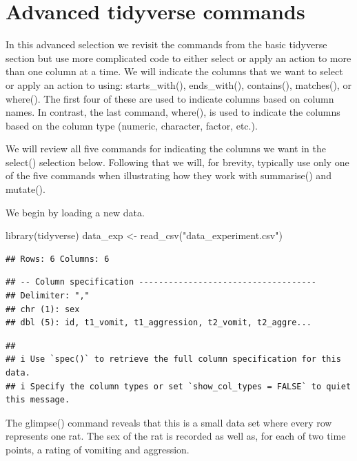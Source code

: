 \documentclass[
]{krantz}
\makeatletter
\newenvironment{Shaded}{\begin{snugshade}}{\end{snugshade}}
\newcommand{\FunctionTok}[1]{\textcolor[rgb]{0,0,0}{#1}}
\newcommand{\NormalTok}[1]{#1}
\newcommand{\OtherTok}[1]{\textcolor[rgb]{0.37,0.37,0.37}{#1}}
\newcommand{\StringTok}[1]{\textcolor[rgb]{0.5,0.5,0.5}{#1}}
\newenvironment{kframe}{%
\medskip{}
\setlength{\fboxsep}{.8em}
 \def\at@end@of@kframe{}%
 \ifinner\ifhmode%
  \def\at@end@of@kframe{\end{minipage}}%
  \begin{minipage}{\columnwidth}%
 \fi\fi%
 \def\FrameCommand##1{\hskip\@totalleftmargin \hskip-\fboxsep
 \colorbox{shadecolor}{##1}\hskip-\fboxsep
     \hskip-\linewidth \hskip-\@totalleftmargin \hskip\columnwidth}%
 \MakeFramed {\advance\hsize-\width
   \@totalleftmargin\z@ \linewidth\hsize
   \@setminipage}}%
 {\par\unskip\endMakeFramed%
 \at@end@of@kframe}
\renewenvironment{Shaded}{\begin{kframe}}{\end{kframe}}
\makeatother
\begin{document}
\hypertarget{advanced-tidyverse-commands}{%
\section{Advanced tidyverse commands}\label{advanced-tidyverse-commands}}

In this advanced selection we revisit the commands from the basic tidyverse section but use more complicated code to either select or apply an action to more than one column at a time. We will indicate the columns that we want to select or apply an action to using: starts\_with(), ends\_with(), contains(), matches(), or where(). The first four of these are used to indicate columns based on column names. In contrast, the last command, where(), is used to indicate the columns based on the column type (numeric, character, factor, etc.).

We will review all five commands for indicating the columns we want in the select() selection below. Following that we will, for brevity, typically use only one of the five commands when illustrating how they work with summarise() and mutate().

We begin by loading a new data.

\begin{Shaded}
\begin{Highlighting}[]
\FunctionTok{library}\NormalTok{(tidyverse)}
\NormalTok{data\_exp }\OtherTok{\textless{}{-}} \FunctionTok{read\_csv}\NormalTok{(}\StringTok{"data\_experiment.csv"}\NormalTok{)}
\end{Highlighting}
\end{Shaded}

\begin{verbatim}
## Rows: 6 Columns: 6
\end{verbatim}

\begin{verbatim}
## -- Column specification ------------------------------------
## Delimiter: ","
## chr (1): sex
## dbl (5): id, t1_vomit, t1_aggression, t2_vomit, t2_aggre...
\end{verbatim}

\begin{verbatim}
## 
## i Use `spec()` to retrieve the full column specification for this data.
## i Specify the column types or set `show_col_types = FALSE` to quiet this message.
\end{verbatim}

The glimpse() command reveals that this is a small data set where every row represents one rat. The sex of the rat is recorded as well as, for each of two time points, a rating of vomiting and aggression.
\end{document}
